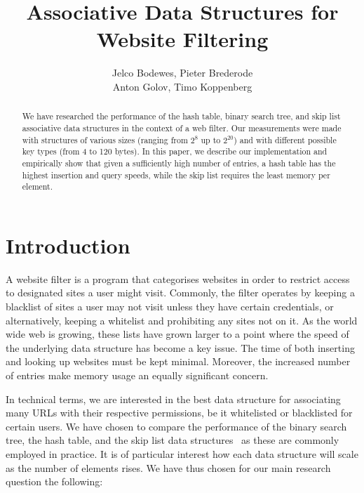 \documentclass[12pt,a4paper]{article}
\title{Associative Data Structures for Website Filtering}
\author{Jelco Bodewes, Pieter Brederode \\ Anton Golov, Timo Koppenberg }
\begin{document}
    \maketitle

    \begin{abstract}
        We have researched the performance of the hash table, binary search tree, and skip list
        associative data structures in the context of a web filter.  Our measurements were made with
        structures of various sizes (ranging from $2^8$ up to $2^{20}$) and with different possible
        key types (from 4 to 120 bytes).  In this paper, we describe our implementation and
        empirically show that given a sufficiently high number of entries, a hash table has the
        highest insertion and query speeds, while the skip list requires the least memory per
        element.
    \end{abstract}


    \section{Introduction}
    A website filter is a program that categorises websites in order to restrict access to
    designated sites a user might visit. Commonly, the filter operates by keeping a blacklist of
    sites a user may not visit unless they have certain credentials, or alternatively, keeping a
    whitelist and prohibiting any sites not on it.  As the world wide web is growing, these lists
    have grown larger to a point where the speed of the underlying data structure has become a key
    issue.  The time of both inserting and looking up websites must be kept minimal. Moreover, the
    increased number of entries make memory usage an equally significant concern.

    In technical terms, we are interested in the best data structure for associating many URLs with
    their respective permissions, be it whitelisted or blacklisted for certain users.  We have
    chosen to compare the performance of the binary search tree, the hash table, and the skip list
    data structures~\cite{Algorithms} as these are commonly employed in practice.  It is of
    particular interest how each data structure will scale as the number of elements rises.  We have
    thus chosen for our main research question the following:
\end{document}
